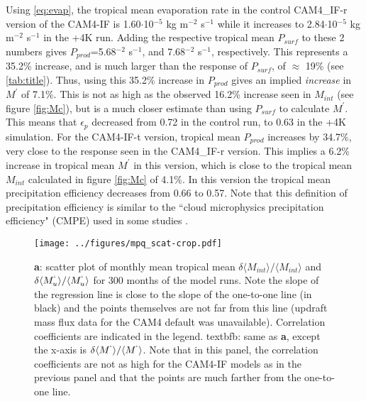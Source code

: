 \documentclass[letterpaper,12pt,titlepage,oneside,final]{book}
\begin{document}
Using \ref{eq:evap}, the tropical mean evaporation rate in the control CAM4_IF-r version of the CAM4-IF is 1.60$\cdot$10$^{-5}$ kg m$^{-2}$ s$^{-1}$ while it increases to 2.84$\cdot$10$^{-5}$ kg m$^{-2}$ s$^{-1}$ in the +4K run. Adding the respective tropical mean $P_{surf}$ to these 2 numbers gives $P_{prod}$=5.68$^{-2}$ s$^{-1}$, and 7.68$^{-2}$ s$^{-1}$, respectively. This represents a 35.2\% increase, and is much larger than the response of $P_{surf}$, of $\approx$ 19\% (see \ref{tab:title}). Thus, using this 35.2\% increase in $P_{prod}$ gives an implied \textit{increase} in $M^{'}$ of 7.1\%. This is not as high as the observed 16.2\% increase seen in $M_{int}$ (see figure \ref{fig:Mc}), but is a much closer estimate than using $P_{surf}$ to calculate $M^{'}$. This means that $\epsilon_{p}$ decreased from 0.72 in the control run, to 0.63 in the +4K simulation. For the CAM4-IF-t version, tropical mean $P_{prod}$ increases by 34.7\%, very close to the response seen in the CAM4_IF-r version. This implies a 6.2\% increase in tropical mean $M^{'}$ in this version, which is close to the tropical mean $M_{int}$ calculated in figure \ref{fig:Mc} of 4.1\%. In this version the tropical mean precipitation efficiency decreases from 0.66 to 0.57. Note that this definition of precipitation efficiency is similar to the ``cloud microphysics precipitation efficiency" (CMPE) used in some studies \citep{schoenberg_ferrier_factors_1996,sui_definition_2007}.

\begin{figure}[H]
\centering
\noindent\texttt{[image: ../figures/mpq\_scat-crop.pdf]}\hfill
\caption{\textbf{a}: scatter plot of monthly mean tropical mean $\delta{\langle{M_{int}}}\rangle/\langle{M_{int}}\rangle$ and $\delta{\langle{M_{u}^{`}}}\rangle/\langle{M_{u}^{`}}\rangle$ for 300 months of the model runs. Note the slope of the regression line is close to the slope of the one-to-one line (in black) and the points themselves are not far from this line (updraft mass flux data for the CAM4 default was unavailable). Correlation coefficients are indicated in the legend. textbf{b}: same as \textbf{a}, except the x-axis is $\delta{\langle{M^{`}}}\rangle/\langle{M^{`}}\rangle$. Note that in this panel, the correlation coefficients are not as high for the CAM4-IF models as in the previous panel and that the points are much farther from the one-to-one line.   }
\end{figure}
\end{document}
